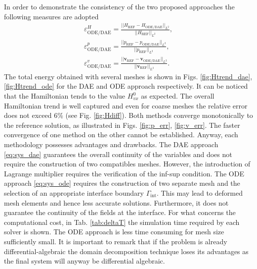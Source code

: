 \documentclass{ifacconf}
\begin{document}
In order to demonstrate the consistency of the two proposed approaches the following measures are adopted
\begin{align*}
\varepsilon^{H}_{\text{ODE}/\text{DAE}} = \frac{||H_{\text{REF}} - H_{\text{ODE}/\text{DAE}} ||_{L^2}}{||H_{\text{REF}}||_{L^2}}, \\
\varepsilon^p_{\text{ODE}/\text{DAE}} = \frac{||p_{\text{REF}} - p_{\text{ODE}/\text{DAE}} ||_{L^2}}{||p_{\text{REF}}||_{L^2}}, \\
\varepsilon^v_{\text{ODE}/\text{DAE}} = \frac{||\bm{v}_{\text{REF}} - \bm{v}_{\text{ODE}/\text{DAE}} ||_{L^2}}{||\mathbf{v}_{\text{REF}}||_{L^2}}. 
\end{align*}
The total energy obtained with several meshes is shown in Figs. \ref{fig:Htrend_dae}, \ref{fig:Htrend_ode} for the DAE and ODE approach respectively. It can be noticed that the Hamiltonian tends to the value $H_{vx}^0$ as expected. The overall Hamiltonian trend is well captured and even for coarse meshes the relative error does not exceed 6\% (see Fig. \ref{fig:Hdiff}).
Both methods converge monotonically to the reference solution, as illustrated in Figs. \ref{fig:p_err}, \ref{fig:v_err}. The faster convergence of one method on the other cannot be established. Anyway, each methodology possesses advantages and drawbacks. The DAE approach \eqref{eq:sys_dae} guarantees the overall continuity of the variables and does not require the construction of two compatibles meshes. However, the introduction of Lagrange multiplier requires the verification of the inf-sup condition.  The ODE approach \eqref{eq:sys_ode} requires the construction of two separate mesh and the selection of an appropriate interface boundary $\Gamma_{\text{int}}$. This may lead to deformed mesh elements and hence less accurate solutions.  Furthermore, it does not guarantee the continuity of the fields at the interface. For what concerns the computational cost, in Tab. \ref{tab:deltaT} the simulation time required by each solver is shown. The ODE approach is less time consuming for mesh size sufficiently small. It is important to remark that if the problem is already differential-algebraic \cite{TFMST1,TFMST2} the domain decomposition technique loses its advantages as the final system will anyway be differential algebraic.
\end{document}
